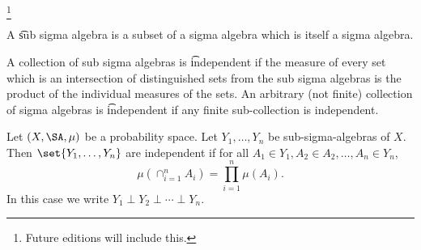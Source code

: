 
  \ifhmode\unskip\fi\footnote{
Future editions will include this.
  }


A \t{sub sigma algebra} is a subset of a sigma algebra which is itself a sigma algebra.

A collection of sub sigma algebras is \t{independent} if the measure
of every set which is an intersection of distinguished sets from the sub sigma algebras is the product of the individual measures of the sets.
An arbitrary (not finite) collection of sigma algebras is \t{independent}
if any finite sub-collection is independent.


Let $(X, \SA, \mu )$ be a probability space.
Let $Y_1, \dots, Y_n$ be sub-sigma-algebras of $X$.
Then $\set{Y_1, \dots, Y_n}$ are independent if for all $A_1 \in Y_1, A_2 \in A_2, \dots, A_n \in Y_n$,
  \[
\mu (\cap_{i = 1}^{n} A_i) = \prod_{i = 1}^{n} \mu (A_i).
  \]
In this case we write $Y_1 \perp Y_2 \perp \cdots \perp Y_n$.

\blankpage
